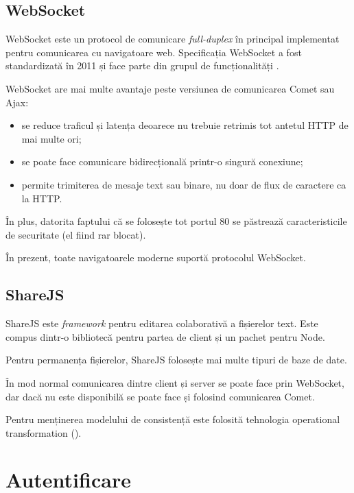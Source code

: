 \documentclass[a4wide,12pt]{report}
\newcommand{\eng}[1]{\emph{#1}} %
\newcommand{\acr}[1]{{\textsmaller[1]{\textsc{#1}}}} %
\begin{document}
\subsection{WebSocket}
\label{websocketsub}

WebSocket este un protocol de comunicare \eng{full-duplex} în principal
implementat pentru comunicarea cu navigatoare web. Specificația WebSocket a fost
standardizată în 2011 și face parte din grupul de funcționalități \acr{HTML5}.

WebSocket are mai multe avantaje peste versiunea de comunicarea Comet sau Ajax:

\begin{itemize}

\item se reduce traficul și latența deoarece nu trebuie retrimis tot antetul
HTTP de mai multe ori;

\item se poate face comunicare bidirecțională printr-o singură conexiune;

\item permite trimiterea de mesaje text sau binare, nu doar de flux de caractere
ca la HTTP.

\end{itemize}

În plus, datorita faptului că se folosește tot portul 80 se păstrează
caracteristicile de securitate (el fiind rar blocat).

În prezent, toate navigatoarele moderne suportă protocolul WebSocket.

\subsection{ShareJS}
\label{sharejssub}

ShareJS este \eng{framework} pentru editarea colaborativă a fișierelor text.
Este compus dintr-o bibliotecă pentru partea de client și un pachet pentru Node.

Pentru permanența fișierelor, ShareJS folosește mai multe tipuri de baze de
date.

În mod normal comunicarea dintre client și server se poate face prin WebSocket,
dar dacă nu este disponibilă se poate face și folosind comunicarea Comet.

Pentru menținerea modelului de consistență este folosită tehnologia operational
transformation (\acr{OT}).

\section{Autentificare}
\end{document}

